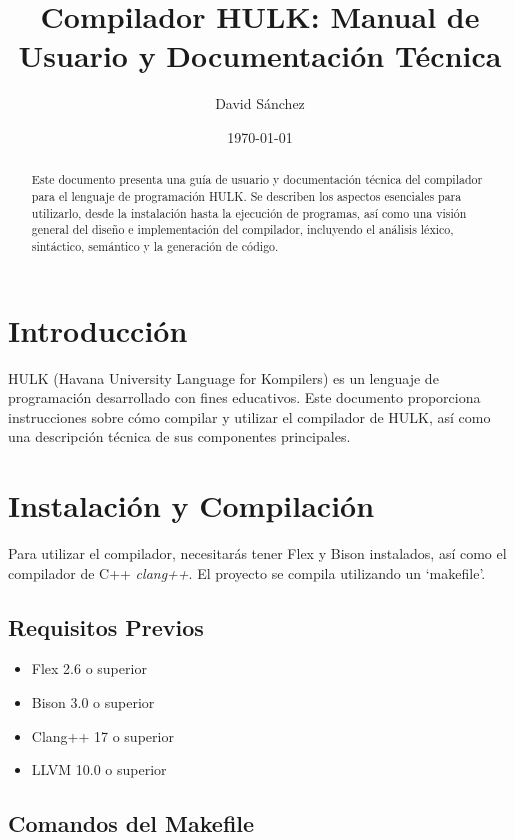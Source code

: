 \documentclass{article}
\title{Compilador HULK: Manual de Usuario y Documentación Técnica}
\author{David S\'anchez}
\date{\today}
\begin{document}
\maketitle

\begin{abstract}
    Este documento presenta una guía de usuario y documentación técnica del compilador para el lenguaje de programación HULK. Se describen los aspectos esenciales para utilizarlo, desde la instalación hasta la ejecución de programas, así como una visión general del diseño e implementación del compilador, incluyendo el análisis léxico, sintáctico, semántico y la generación de código.
\end{abstract}

\tableofcontents

\newpage

\section{Introducción}

HULK (Havana University Language for Kompilers) es un lenguaje de programación desarrollado con fines educativos. Este documento proporciona instrucciones sobre cómo compilar y utilizar el compilador de HULK, así como una descripción técnica de sus componentes principales.

\section{Instalación y Compilación}

Para utilizar el compilador, necesitarás tener Flex y Bison instalados, así como el compilador de C++ \textit{clang++}. El proyecto se compila utilizando un `makefile'.

\subsection{Requisitos Previos}

\begin{itemize}
    \item Flex 2.6 o superior
    \item Bison 3.0 o superior
    \item Clang++ 17 o superior
    \item LLVM 10.0 o superior
\end{itemize}

\subsection{Comandos del Makefile}
\end{document}
